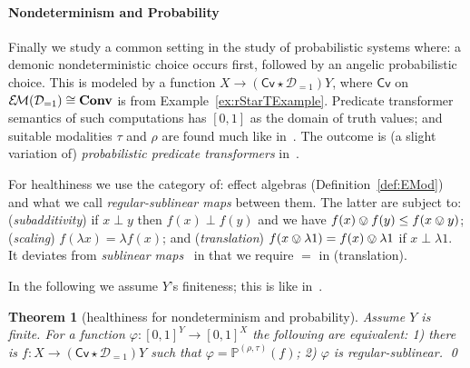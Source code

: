 \documentclass[9pt, preprint]{sigplanconf}
\theoremstyle{theorem}
\newtheorem{theorem}{Theorem}[section]
\theoremstyle{definition}
\renewcommand{\phi}{\varphi}
\newcommand{\dist}{\mathcal{D}_{=1}}
\newcommand{\Conv}{\mathbf{Conv}}
\newcommand{\EM}{\mathcal{E}{\kern-.5ex}\mathcal{M}}
\newcommand{\bbP}{\mathbb{P}}
\newcommand{\RC}{\mathsf{Cv}}
\begin{document}
\paragraph{Nondeterminism and Probability}
Finally we study a common setting in the study of probabilistic systems
where: a demonic nondeterministic choice occurs first, followed by an
angelic probabilistic choice. This is modeled by a function $X\to
(\RC\star \dist)Y$, where $\RC$ on $\EM(\dist)\cong\Conv$ is from
Example~\ref{ex:rStarTExample}.
Predicate transformer semantics of such computations has $[0,1]$ as the
domain of truth values; and suitable modalities $\tau$ and
$\rho$ are found much like in~\cite{Hasuo15TCS}. The outcome is (a
slight variation of) \emph{probabilistic predicate transformers} in~\cite{MorganMS96}.

For healthiness we use the category
of: effect algebras (Definition~\ref{def:EMod}) and what we call
\emph{regular-sublinear maps} between them. The latter are subject to:
(\emph{subadditivity}) if $x \perp y$ then $f(x) \perp f(y)$ and we
have $f(x) \ovee f(y) \leq f(x \ovee y)$; (\emph{scaling}) $f(\lambda
x) = \lambda f(x)$; and (\emph{translation}) $f(x \ovee \lambda 1) =
f(x) \ovee \lambda 1$ if $x \perp \lambda 1$. It deviates from
\emph{sublinear maps}~\cite{MorganMS96} in that we require $=$ in
(translation).



In the following we assume $Y$'s finiteness; this is like in~\cite{MorganMS96}.

\begin{theorem}[healthiness for nondeterminism and probability]
  Assume $Y$ is finite.
  For a function
  $\varphi \colon [0, 1]^Y \to [0, 1]^X$ the following are equivalent:
  1) there is  $f \colon X \to (\RC\star \dist) Y$ such that
  $\varphi = \bbP^{(\rho, \tau)}(f)$; 2) $\phi$ is regular-sublinear.
\qed
\end{theorem}
\end{document}
